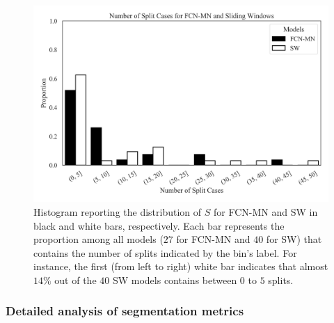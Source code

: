 \documentclass[a4paper,authoryear,review]{elsarticle}
\begin{document}
\begin{figure}
    \centering
    \includegraphics[width=\textwidth]{figures/PPP_split_distribution.png}
    \caption{Histogram reporting the distribution of $S$ for FCN-MN and SW in black and white bars, respectively. Each bar represents the proportion among all models ($27$ for FCN-MN  and $40$ for SW) that contains the number of splits indicated by the bin’s label. For instance, the first (from left to right) white bar indicates that almost $14\%$ out of the $40$ SW models contains between $0$ to $5$ splits. }
    \label{fig:number-of-split}
\end{figure}


\subsubsection{Detailed analysis of segmentation metrics}
\end{document}
